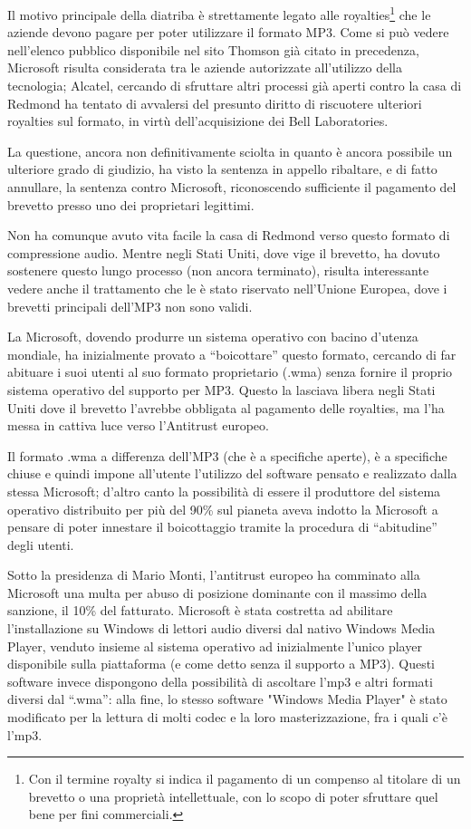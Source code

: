 Il motivo principale della diatriba è strettamente legato alle royalties\footnote{Con il termine royalty si indica il pagamento di un compenso al titolare di un brevetto o una proprietà intellettuale, con lo scopo di poter sfruttare quel bene per fini commerciali.} che le aziende devono pagare per poter utilizzare il formato MP3. Come si può vedere nell'elenco pubblico disponibile nel sito Thomson già citato in precedenza, Microsoft risulta considerata tra le aziende autorizzate all'utilizzo della tecnologia; Alcatel, cercando di sfruttare altri processi già aperti contro la casa di Redmond ha tentato di avvalersi del presunto diritto di riscuotere ulteriori royalties sul formato, in virtù dell'acquisizione dei Bell Laboratories.

La questione, ancora non definitivamente sciolta in quanto è ancora possibile un ulteriore grado di giudizio, ha visto la sentenza in appello ribaltare, e di fatto annullare, la sentenza contro Microsoft, riconoscendo sufficiente il pagamento del brevetto presso uno dei proprietari legittimi.

Non ha comunque avuto vita facile la casa di Redmond verso questo formato di compressione audio. Mentre negli Stati Uniti, dove vige il brevetto, ha dovuto sostenere questo lungo processo (non ancora terminato), risulta interessante vedere anche il trattamento che le è stato riservato nell'Unione Europea, dove i brevetti principali dell'MP3 non sono validi.

La Microsoft, dovendo produrre un sistema operativo con bacino d'utenza mondiale, ha inizialmente provato a ``boicottare'' questo formato, cercando di far abituare i suoi utenti al suo formato proprietario (.wma) senza fornire il proprio sistema operativo del supporto per MP3. Questo la lasciava libera negli Stati Uniti dove il brevetto l'avrebbe obbligata al pagamento delle royalties, ma l'ha messa in cattiva luce verso l'Antitrust europeo. 

Il formato .wma a differenza dell'MP3 (che è a specifiche aperte), è a specifiche chiuse e quindi impone all'utente l'utilizzo del software pensato e realizzato dalla stessa Microsoft; d'altro canto la possibilità di essere il produttore del sistema operativo distribuito per più del 90\% sul pianeta aveva indotto la Microsoft a pensare di poter innestare il boicottaggio tramite la procedura di ``abitudine'' degli utenti. 

Sotto la presidenza di Mario Monti, l'antitrust europeo ha comminato alla Microsoft una multa per abuso di posizione dominante con il massimo della sanzione, il 10\% del fatturato. Microsoft è stata costretta ad abilitare l'installazione su Windows di lettori audio diversi dal nativo Windows Media Player, venduto insieme al sistema operativo ad inizialmente l'unico player disponibile sulla piattaforma (e come detto senza il supporto a MP3). Questi software invece dispongono della possibilità di ascoltare l'mp3 e altri formati diversi dal ``.wma'': alla fine, lo stesso software "Windows Media Player" è stato modificato per la lettura di molti codec e la loro masterizzazione, fra i quali c'è l'mp3.

